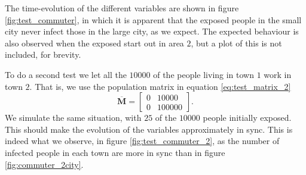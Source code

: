 The time-evolution of the different variables are shown in figure \ref{fig:test_commuter}, in which it is apparent that the exposed people in the small city never infect those in the large city, as we expect. The expected behaviour is also observed when the exposed start out in area $2$, but a plot of this is not included, for brevity. 

To do a second test we let all the $10000$ of the people living in town $1$ work in town $2$. That is, we use the population matrix in equation \eqref{eq:test_matrix_2}
\begin{equation}\label{eq:test_matrix_2}
	\mathbf{\overline{M}} = \begin{bmatrix}
		0 & 10000 \\
		0 & 100000 
	\end{bmatrix}.
\end{equation}
We simulate the same situation, with $25$ of the $10000$ people initially exposed. This should make the evolution of the variables approximately in sync. This is indeed what we observe, in figure \ref{fig:test_commuter_2}, as the number of infected people in each town are more in sync than in figure \ref{fig:commuter_2city}.


